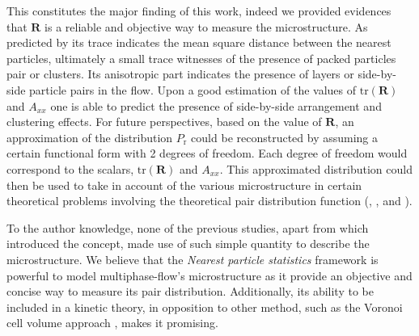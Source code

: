 \begin{enumerate}
    This constitutes the major finding of this work, indeed we provided evidences that $\textbf{R}$ is a reliable and objective way to measure the microstructure.
    As predicted by \citet{zhang2023evolution} its trace indicates the mean square distance between the nearest particles, ultimately a small trace witnesses of the presence of packed particles pair or clusters.
    Its anisotropic part indicates the presence of layers or side-by-side particle pairs in the flow. %
Upon a good estimation of the values of $\text{tr}(\textbf{R})$ and $A_{xx}$ one is able to predict the presence of side-by-side arrangement and clustering effects. 
For future perspectives, based on the value of $\textbf{R}$, an approximation of the distribution $P_\text{r}$ could be reconstructed by assuming a certain functional form with 2 degrees of freedom.
Each degree of freedom would correspond to the scalars, $\text{tr}(\textbf{R})$ and $A_{xx}$.
This approximated distribution could then be used to take in account of the various microstructure in certain theoretical problems involving the theoretical pair distribution function (\citet{batchelor1972sedimentation}, \citet{hinch1977averaged}, and \citet{zhang2021ensemble}).
\end{enumerate}
To the author knowledge, none of the previous studies, apart from \citet{zhang2023evolution} which introduced the concept, made use of such simple quantity to describe the microstructure. 
We believe that the \textit{Nearest particle statistics} framework is powerful to model multiphase-flow's microstructure as it provide an objective and concise way to measure its pair distribution. 
Additionally, its ability to be included in a kinetic theory, in opposition to other method,  such as the Voronoi cell volume approach \citep{senthil2005voronoi}, makes it promising. 






